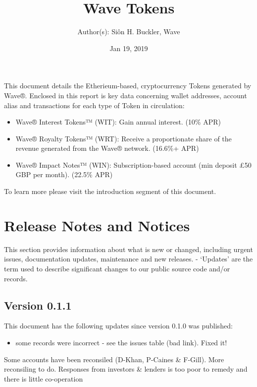 \documentclass[letterpaper,10pt,openany,oneside,english]{sphinxmanual}
\title{Wave Tokens}
\date{Jan 19, 2019}
\author{Author(s): Siôn H. Buckler, Wave}
\begin{document}
\maketitle
\sphinxtableofcontents
{}\label{\detokenize{index::doc}}


This document details the Etherieum-based, cryptocurrency Tokens generated by Wave®.
Enclosed in this report is key data concerning wallet addresses, account alias and transactions for each type of Token in circulation:
\begin{itemize}
\item {} 
Wave® Interest Tokens™ (WIT): Gain annual interest. (10\% APR)

\item {} 
Wave® Royalty Tokens™ (WRT): Receive a proportionate share of the revenue generated from the Wave® network. (16.6\%+ APR)

\item {} 
Wave® Impact Notes™ (WIN): Subscription-based account (min deposit £50 GBP per month). (22.5\% APR)

\end{itemize}

To learn more please visit the introduction segment of this document.


\chapter{Release Notes and Notices}
\label{\detokenize{releasenotes:release-notes-and-notices}}\label{\detokenize{releasenotes::doc}}
This section provides information about what is new or changed, including urgent issues, documentation updates, maintenance and new releases.
- ‘Updates’ are the term used to describe significant changes to our public source code and/or records.


\section{Version 0.1.1}
\label{\detokenize{releasenotes:version-0-1-1}}
This document has the following updates since version 0.1.0 was published:
\begin{itemize}
\item {} 
some records were incorrect - see the issues table (bad link). Fixed it!

\end{itemize}

Some accounts have been reconsiled (D-Khan, P-Caines \& F-Gill).
More reconsiling to do. Responses from investors \& lenders is too poor to remedy and there is little co-operation
\end{document}
